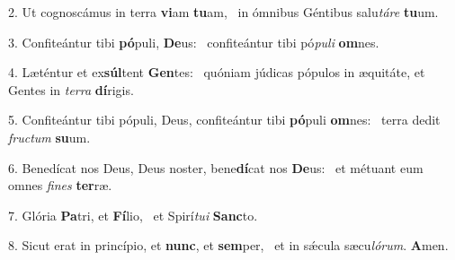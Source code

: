 2. Ut cognoscámus in terra \textbf{vi}am \textbf{tu}am, \ast\  in ómnibus Géntibus salu\textit{tá}\textit{re} \textbf{tu}um.\

3. Confiteántur tibi \textbf{pó}puli, \textbf{De}us: \ast\  confiteántur tibi pó\textit{pu}\textit{li} \textbf{om}nes.\

4. Læténtur et ex\textbf{súl}tent \textbf{Gen}tes: \ast\  quóniam júdicas pópulos in æquitáte, et Gentes in \textit{ter}\textit{ra} \textbf{dí}rigis.\

5. Confiteántur tibi pópuli, Deus, confiteántur tibi \textbf{pó}puli \textbf{om}nes: \ast\  terra dedit \textit{fruc}\textit{tum} \textbf{su}um.\

6. Benedícat nos Deus, Deus noster, bene\textbf{dí}cat nos \textbf{De}us: \ast\  et métuant eum omnes \textit{fi}\textit{nes} \textbf{ter}ræ.\

7. Glória \textbf{Pa}tri, et \textbf{Fí}lio, \ast\  et Spirí\textit{tu}\textit{i} \textbf{Sanc}to.\

8. Sicut erat in princípio, et \textbf{nunc}, et \textbf{sem}per, \ast\  et in sǽcula sæcu\textit{ló}\textit{rum}. \textbf{A}men.\

